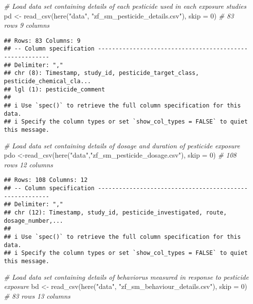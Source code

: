 \documentclass[
]{article}
\newenvironment{Shaded}{\begin{snugshade}}{\end{snugshade}}
\newcommand{\AttributeTok}[1]{\textcolor[rgb]{0.77,0.63,0.00}{#1}}
\newcommand{\CommentTok}[1]{\textcolor[rgb]{0.56,0.35,0.01}{\textit{#1}}}
\newcommand{\DecValTok}[1]{\textcolor[rgb]{0.00,0.00,0.81}{#1}}
\newcommand{\FunctionTok}[1]{\textcolor[rgb]{0.00,0.00,0.00}{#1}}
\newcommand{\NormalTok}[1]{#1}
\newcommand{\OtherTok}[1]{\textcolor[rgb]{0.56,0.35,0.01}{#1}}
\newcommand{\StringTok}[1]{\textcolor[rgb]{0.31,0.60,0.02}{#1}}
\begin{document}
\begin{Shaded}
\begin{Highlighting}[]
\CommentTok{\# Load data set containing details of each pesticide used in each exposure studies}
\NormalTok{pd }\OtherTok{\textless{}{-}} \FunctionTok{read\_csv}\NormalTok{(}\FunctionTok{here}\NormalTok{(}\StringTok{"data"}\NormalTok{, }\StringTok{"zf\_sm\_pesticide\_details.csv"}\NormalTok{), }\AttributeTok{skip =} \DecValTok{0}\NormalTok{) }\CommentTok{\# 83 rows 9 columns }
\end{Highlighting}
\end{Shaded}

\begin{verbatim}
## Rows: 83 Columns: 9
## -- Column specification --------------------------------------------------------
## Delimiter: ","
## chr (8): Timestamp, study_id, pesticide_target_class, pesticide_chemical_cla...
## lgl (1): pesticide_comment
## 
## i Use `spec()` to retrieve the full column specification for this data.
## i Specify the column types or set `show_col_types = FALSE` to quiet this message.
\end{verbatim}

\begin{Shaded}
\begin{Highlighting}[]
\CommentTok{\# Load data set containing details of dosage and duration of pesticide exposure }
\NormalTok{pdo }\OtherTok{\textless{}{-}}\FunctionTok{read\_csv}\NormalTok{(}\FunctionTok{here}\NormalTok{(}\StringTok{"data"}\NormalTok{,}\StringTok{"zf\_sm\_pesticide\_dosage.csv"}\NormalTok{), }\AttributeTok{skip =} \DecValTok{0}\NormalTok{) }\CommentTok{\# 108 rows 12 columns }
\end{Highlighting}
\end{Shaded}

\begin{verbatim}
## Rows: 108 Columns: 12
## -- Column specification --------------------------------------------------------
## Delimiter: ","
## chr (12): Timestamp, study_id, pesticide_investigated, route, dosage_number,...
## 
## i Use `spec()` to retrieve the full column specification for this data.
## i Specify the column types or set `show_col_types = FALSE` to quiet this message.
\end{verbatim}

\begin{Shaded}
\begin{Highlighting}[]
\CommentTok{\# Load data set containing details of behaviorus measured in response to pesticide exposure }
\NormalTok{bd }\OtherTok{\textless{}{-}} \FunctionTok{read\_csv}\NormalTok{(}\FunctionTok{here}\NormalTok{(}\StringTok{"data"}\NormalTok{, }\StringTok{"zf\_sm\_behaviour\_details.csv"}\NormalTok{), }\AttributeTok{skip =} \DecValTok{0}\NormalTok{) }\CommentTok{\# 83 rows 13 columns }
\end{Highlighting}
\end{Shaded}
\end{document}
